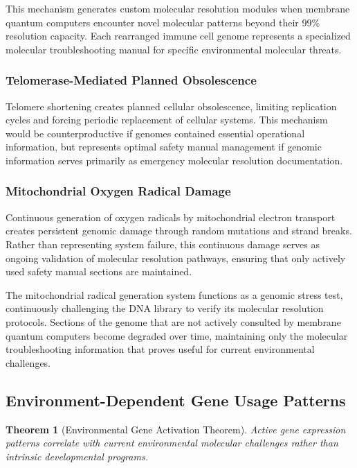 \documentclass[12pt,a4paper]{article}
\newtheorem{theorem}{Theorem}
\begin{document}
This mechanism generates custom molecular resolution modules when membrane quantum computers encounter novel molecular patterns beyond their 99\% resolution capacity. Each rearranged immune cell genome represents a specialized molecular troubleshooting manual for specific environmental molecular threats.

\subsubsection{Telomerase-Mediated Planned Obsolescence}

Telomere shortening creates planned cellular obsolescence, limiting replication cycles and forcing periodic replacement of cellular systems. This mechanism would be counterproductive if genomes contained essential operational information, but represents optimal safety manual management if genomic information serves primarily as emergency molecular resolution documentation.

\subsubsection{Mitochondrial Oxygen Radical Damage}

Continuous generation of oxygen radicals by mitochondrial electron transport creates persistent genomic damage through random mutations and strand breaks. Rather than representing system failure, this continuous damage serves as ongoing validation of molecular resolution pathways, ensuring that only actively used safety manual sections are maintained.

The mitochondrial radical generation system functions as a genomic stress test, continuously challenging the DNA library to verify its molecular resolution protocols. Sections of the genome that are not actively consulted by membrane quantum computers become degraded over time, maintaining only the molecular troubleshooting information that proves useful for current environmental challenges.

\subsection{Environment-Dependent Gene Usage Patterns}

\begin{theorem}[Environmental Gene Activation Theorem]
Active gene expression patterns correlate with current environmental molecular challenges rather than intrinsic developmental programs.
\end{theorem}
\end{document}
